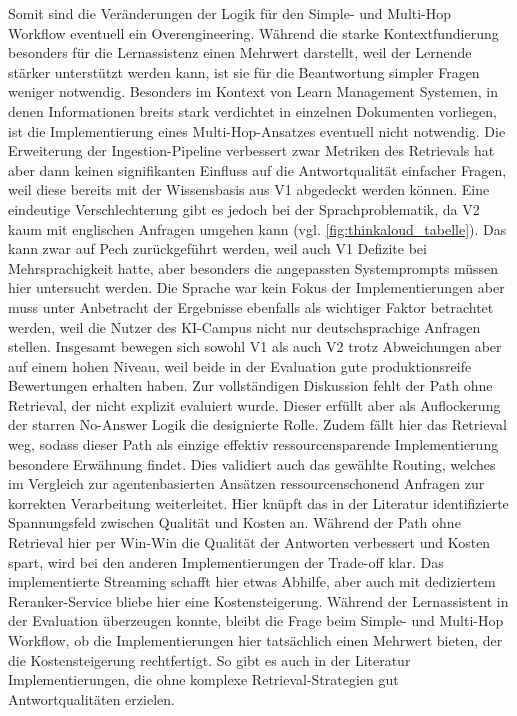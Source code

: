 Somit sind die Veränderungen der Logik für den Simple- und Multi-Hop Workflow eventuell ein Overengineering.
Während die starke Kontextfundierung besonders für die Lernassistenz einen Mehrwert darstellt, weil der Lernende stärker unterstützt werden kann, ist sie für die Beantwortung simpler Fragen weniger notwendig.
Besonders im Kontext von Learn Management Systemen, in denen Informationen breits stark verdichtet in einzelnen Dokumenten vorliegen, ist die Implementierung eines Multi-Hop-Ansatzes eventuell nicht notwendig.
Die Erweiterung der Ingestion-Pipeline verbessert zwar Metriken des Retrievals hat aber dann keinen signifikanten Einfluss auf die Antwortqualität einfacher Fragen, weil diese bereits mit der Wissensbasis aus V1 abgedeckt werden können.
Eine eindeutige Verschlechterung gibt es jedoch bei der Sprachproblematik, da V2 kaum mit englischen Anfragen umgehen kann (vgl. \autoref{fig:thinkaloud_tabelle}).
Das kann zwar auf Pech zurückgeführt werden, weil auch V1 Defizite bei Mehrsprachigkeit hatte, aber besonders die angepassten Systemprompts müssen hier untersucht werden.
Die Sprache war kein Fokus der Implementierungen aber muss unter Anbetracht der Ergebnisse ebenfalls als wichtiger Faktor betrachtet werden, weil die Nutzer des KI-Campus nicht nur deutschsprachige Anfragen stellen.
Insgesamt bewegen sich sowohl V1 als auch V2 trotz Abweichungen aber auf einem hohen Niveau, weil beide in der Evaluation gute produktionsreife Bewertungen erhalten haben.
Zur vollständigen Diskussion fehlt der Path ohne Retrieval, der nicht explizit evaluiert wurde.
Dieser erfüllt aber als Auflockerung der starren No-Answer Logik die designierte Rolle.
Zudem fällt hier das Retrieval weg, sodass dieser Path als einzige effektiv ressourcensparende Implementierung besondere Erwähnung findet.
Dies validiert auch das gewählte Routing, welches im Vergleich zur agentenbasierten Ansätzen ressourcenschonend Anfragen zur korrekten Verarbeitung weiterleitet.
Hier knüpft das in der Literatur identifizierte Spannungsfeld zwischen Qualität und Kosten an.
Während der Path ohne Retrieval hier per Win-Win die Qualität der Antworten verbessert und Kosten spart, wird bei den anderen Implementierungen der Trade-off klar.
Das implementierte Streaming schafft hier etwas Abhilfe, aber auch mit dediziertem Reranker-Service bliebe hier eine Kostensteigerung.
Während der Lernassistent in der Evaluation überzeugen konnte, bleibt die Frage beim Simple- und Multi-Hop Workflow, ob die Implementierungen hier tatsächlich einen Mehrwert bieten, der die Kostensteigerung rechtfertigt.
So gibt es auch in der Literatur Implementierungen, die ohne komplexe Retrieval-Strategien gut Antwortqualitäten erzielen.


